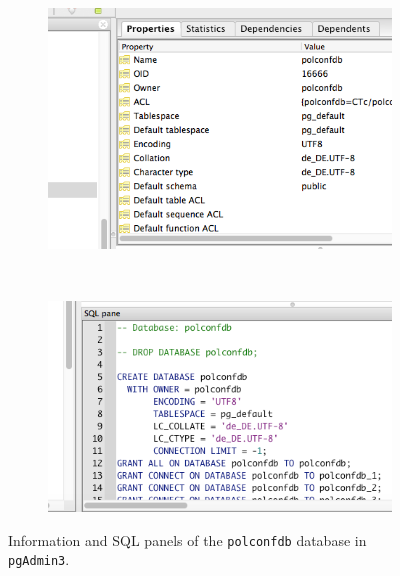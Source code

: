 \begin{figure}[ht!]
\centering
  \begin{subfigure}{.45\textwidth}
  \includegraphics[width=\textwidth,trim= 0 0 0 0, clip]{pcdb_documentation_screenshots/pgadmin3_inside_pcdb_information_panel.png}
    \label{fig_pgadmin3_inside_pcdb_information_panel}
  \end{subfigure}
  ~%
  \begin{subfigure}{.45\textwidth}
  \includegraphics[width=\textwidth,trim= 0 0 0 0, clip]{pcdb_documentation_screenshots/pgadmin3_inside_pcdb_SQL_pane.png}
    \label{fig_pgadmin3_inside_pcdb_SQL_pane}
  \end{subfigure} 
  \caption{Information and SQL panels of the \texttt{polconfdb} database in \texttt{pgAdmin3}.}
\end{figure}
